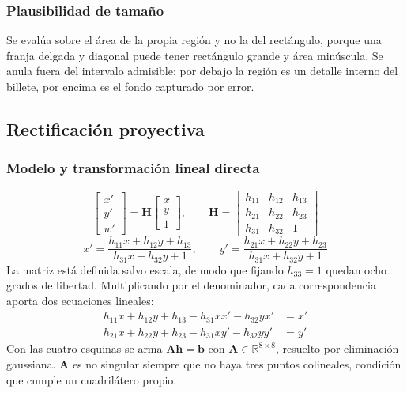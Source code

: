 \documentclass[conference]{IEEEtran}
\begin{document}
\subsubsection{Plausibilidad de tamaño}
Se evalúa sobre el área de la propia región y no la del rectángulo,
porque una franja delgada y diagonal puede tener rectángulo grande y
área minúscula. Se anula fuera del intervalo admisible: por debajo la
región es un detalle interno del billete, por encima es el fondo
capturado por error.

\subsection{Rectificación proyectiva}

\subsubsection{Modelo y transformación lineal directa}
\begin{equation}
\begin{bmatrix}x'\\y'\\w'\end{bmatrix} =
\mathbf{H}\begin{bmatrix}x\\y\\1\end{bmatrix},\qquad
\mathbf{H} = \begin{bmatrix}
h_{11}&h_{12}&h_{13}\\ h_{21}&h_{22}&h_{23}\\ h_{31}&h_{32}&1
\end{bmatrix}
\end{equation}
\begin{equation}
x' = \frac{h_{11}x+h_{12}y+h_{13}}{h_{31}x+h_{32}y+1},\qquad
y' = \frac{h_{21}x+h_{22}y+h_{23}}{h_{31}x+h_{32}y+1}
\end{equation}
La matriz está definida salvo escala, de modo que fijando $h_{33}=1$
quedan ocho grados de libertad. Multiplicando por el denominador, cada
correspondencia aporta dos ecuaciones lineales:
\begin{align}
h_{11}x+h_{12}y+h_{13}-h_{31}xx'-h_{32}yx' &= x'\\
h_{21}x+h_{22}y+h_{23}-h_{31}xy'-h_{32}yy' &= y'
\end{align}
Con las cuatro esquinas se arma $\mathbf{A}\mathbf{h}=\mathbf{b}$ con
$\mathbf{A}\in\mathbb{R}^{8\times8}$, resuelto por eliminación
gaussiana. $\mathbf{A}$ es no singular siempre que no haya tres puntos
colineales, condición que cumple un cuadrilátero propio.
\end{document}
